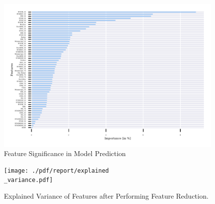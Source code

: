 \begin{figure}
\centering
\begin{adjustbox}{max width=1.2\textwidth,center}
\includegraphics[scale=1.2]{./pdf/report/feature_importance.pdf}
\end{adjustbox}
\caption{Feature Significance in Model Prediction}
\label{fig:feature_importance}
\end{figure}


\begin{figure}[h]
\centering
\texttt{[image: ./pdf/report/explained\\\_variance.pdf]}
\caption{Explained Variance of Features after Performing Feature Reduction.}
\label{fig:explained_variance}
\end{figure}
